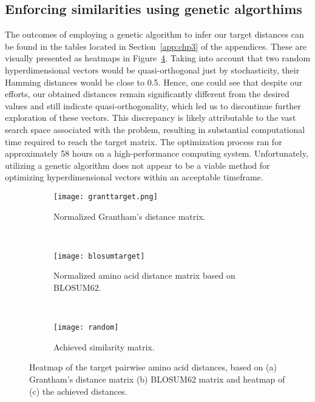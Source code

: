\subsection{Enforcing similarities using genetic algorthims}
The outcomes of employing a genetic algorithm to infer our target distances can be found in the tables located in Section~\ref{app:chp3} of the appendices. These are visually presented as heatmaps in Figure~\ref{fig:ga}. Taking into account that two random hyperdimensional vectors would be quasi-orthogonal just by stochasticity, their Hamming distances would be close to 0.5. Hence, one could see that despite our efforts, our obtained distances remain significantly different from the desired values and still indicate quasi-orthogonality, which led us to discontinue further exploration of these vectors. This discrepancy is likely attributable to the vast search space associated with the problem, resulting in substantial computational time required to reach the target matrix. The optimization process ran for approximately 58 hours on a high-performance computing system. Unfortunately, utilizing a genetic algorithm does not appear to be a viable method for optimizing hyperdimensional vectors within an acceptable timeframe.

\begin{figure}[H]
    \centering
    \begin{minipage}[b]{.5\textwidth}
    \begin{subfigure}[b]{\textwidth}
        \texttt{[image: granttarget.png]}
        \caption{Normalized Grantham's distance matrix.}
        \label{fig:grant}
    \end{subfigure}
\end{minipage}
\\
\centering
    \begin{minipage}[b]{.5\textwidth}
    \begin{subfigure}[b]{\textwidth}
        \texttt{[image: blosumtarget]}
        \caption{Normalized amino acid distance matrix based on BLOSUM62.}
        \label{fig:blosum}
    \end{subfigure}
    \end{minipage}
\\
\centering
    \begin{minipage}[b]{.5\textwidth}
    \begin{subfigure}[b]{\textwidth}
        \texttt{[image: random]}
        \caption{Achieved similarity matrix.}
        \label{fig:random}
    \end{subfigure}
    \end{minipage}
    \caption{Heatmap of the target pairwise amino acid distances, based on (a) Grantham's distance matrix (b) BLOSUM62 matrix and heatmap of (c) the achieved distances.}
    \label{fig:ga}
\end{figure}
